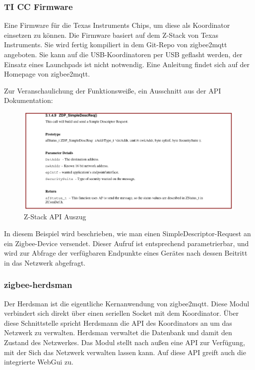 \subsubsection{TI CC Firmware}

Eine Firmware für die Texas Instruments Chips, um diese als Koordinator einsetzen zu können. Die Firmware basiert auf dem Z-Stack von Texas Instruments. Sie wird fertig kompiliert
in dem Git-Repo von zigbee2mqtt angeboten. Sie kann auf die USB-Koordinatoren per USB geflasht werden, der Einsatz eines Launchpads ist nicht notwendig. Eine Anleitung
findet sich auf der Homepage von zigbee2mqtt.  


Zur Veranschaulichung der Funktionsweiße, ein Ausschnitt aus der API Dokumentation:

\begin{figure}[H]
  \centering
  \includegraphics[width=1\textwidth]{media/z-stack-api-excerpt.png}
  \caption{Z-Stack API Auszug}
\end{figure}

In diesem Beispiel wird beschrieben, wie man einen SimpleDescriptor-Request an ein Zigbee-Device versendet. Dieser Aufruf ist entsprechend parametrierbar,
und wird zur Abfrage der verfügbaren Endpunkte eines Gerätes nach dessen Beitritt in das Netzwerk abgefragt.

\subsubsection{zigbee-herdsman}

Der Herdsman ist die eigentliche Kernanwendung von zigbee2mqtt. Diese Modul verbindert sich direkt über einen seriellen Socket mit dem Koordinator. Über diese Schnittstelle
spricht Herdsmann die API des Koordinators an um das Netzwerk zu verwalten. Herdsman verwaltet die Datenbank und damit den Zustand des Netzwerkes. Das Modul stellt nach außen
eine API zur Verfügung, mit der Sich das Netzwerk verwalten lassen kann. Auf diese API greift auch die integrierte WebGui zu.

